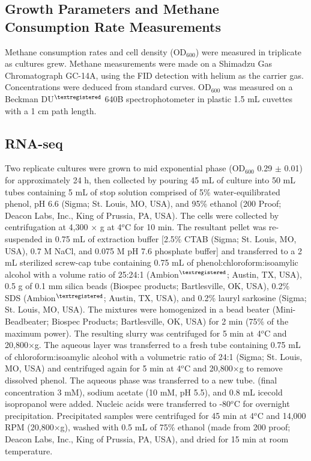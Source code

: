 \subsection{Growth Parameters and Methane Consumption Rate Measurements}
Methane consumption rates and cell density (OD$_{600}$) were measured in triplicate as cultures grew.
Methane measurements were made on a Shimadzu Gas Chromatograph GC-14A, using the FID detection with helium as the carrier gas.
Concentrations were deduced from standard curves.
OD$_{600}$ was measured on a Beckman DU$^{\textregistered}$ 640B spectrophotometer in plastic 1.5 mL cuvettes with a 1 cm path length.

\subsection{RNA-seq}
Two replicate cultures were grown to mid exponential phase (OD$_{600}$ 0.29 $\pm$ 0.01) for approximately 24 h, then collected by pouring 45 mL of culture into 50 mL tubes containing 5 mL of stop solution comprised of 5\% water-equilibrated phenol, pH 6.6 (Sigma; St. Louis, MO, USA), and 95\% ethanol (200 Proof; Deacon Labs, Inc., King of Prussia, PA, USA).
The cells were collected by centrifugation at 4,300 $\times$ g at 4$^o$C for 10 min.
The resultant pellet was re-suspended in 0.75 mL of extraction buffer [2.5\% CTAB (Sigma; St. Louis, MO, USA), 0.7 M NaCl, and 0.075 M pH 7.6 phosphate buffer] and transferred to a 2 mL sterilized screw-cap tube containing 0.75 mL of phenol:chloroform:isoamylic alcohol with a volume ratio of 25:24:1 (Ambion$^{\textregistered}$; Austin, TX, USA), 0.5 g of 0.1 mm silica beads (Biospec products; Bartlesville, OK, USA), 0.2\% SDS (Ambion$^{\textregistered}$; Austin, TX, USA), and 0.2\% lauryl sarkosine (Sigma; St. Louis, MO, USA).
The mixtures were homogenized in a bead beater (Mini-Beadbeater; Biospec Products; Bartlesville, OK, USA) for 2 min (75\% of the maximum power).
The resulting slurry was centrifuged for 5 min at 4$^o$C and 20,800$\times$g.
The aqueous layer was transferred to a fresh tube containing 0.75 mL of chloroform:isoamylic alcohol with a volumetric ratio of 24:1 (Sigma; St. Louis, MO, USA) and centrifuged again for 5 min at 4$^o$C and 20,800$\times$g to remove dissolved phenol.
The aqueous phase was transferred to a new tube.  (final concentration 3 mM), sodium acetate (10 mM, pH 5.5), and 0.8 mL icecold isopropanol were added.
Nucleic acids were transferred to -80$^o$C for overnight precipitation.
Precipitated samples were centrifuged for 45 min at 4$^o$C and 14,000 RPM (20,800$\times$g), washed with 0.5 mL of 75\% ethanol (made from 200 proof; Deacon Labs, Inc., King of Prussia, PA, USA), and dried for 15 min at room temperature.

